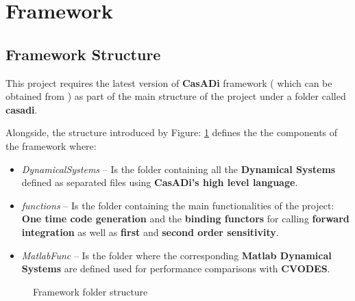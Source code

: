 \documentclass[12pt, letterpaper]{article}
\begin{document}
\section{Framework}
\label{label_framwork}

\subsection{Framework Structure}
\label{label_framework_structure}

This project requires the latest version of \textbf{CasADi} framework ( which can be obtained from \cite{CasADi} ) as part of the main structure of the project under a folder called \textbf{casadi}.

Alongside, the structure introduced by Figure: \ref{label_framework_folder_structure} defines the the components of the framework where:
\begin{itemize}
  \item \textit{DynamicalSystems} -- Is the folder containing all the \textbf{Dynamical Systems} defined as separated files using \textbf{CasADi's high level language}. 
  \item \textit{functions} -- Is the folder containing the main functionalities of the project: \textbf{One time code generation} and the \textbf{binding functors} for calling \textbf{forward integration} as well as \textbf{first} and \textbf{second order sensitivity}.
  \item \textit{MatlabFunc} -- Is the folder where the corresponding \textbf{Matlab Dynamical Systems} are defined used for performance comparisons with \textbf{CVODES}. 
\end{itemize} 


\begin{figure}[h]
\centering
{}
\caption{Framework folder structure}
\label{label_framework_folder_structure}
\end{figure}
\end{document}
